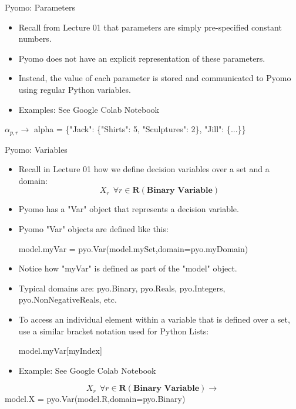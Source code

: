 \documentclass[10pt, aspectratio=169]{beamer}
\begin{document}
\begin{frame}{Pyomo: Parameters}
    \begin{itemize}
        \item Recall from Lecture 01 that parameters are simply pre-specified constant numbers.
        \item Pyomo does not have an explicit representation of these parameters.
        \item Instead, the value of each parameter is stored and communicated to Pyomo using regular Python variables.
        \item Examples: See Google Colab Notebook
    \end{itemize}
    \begin{center}
        $\alpha_{p,r} \rightarrow $ alpha = \{"Jack": \{"Shirts": 5, "Sculptures": 2\}, "Jill": \{...\}\}
    \end{center}
\end{frame}

\begin{frame}{Pyomo: Variables}
    \begin{itemize}
        \item Recall in Lecture 01 how we define decision variables over a set and a domain:
        $$X_r \ \ \forall r \in \textbf{R} \left(\textbf{Binary\ Variable}\right)$$
        \item Pyomo has a "Var" object that represents a decision variable.
        \item Pyomo "Var" objects are defined like this:
        
        \hspace{0.25cm} model.myVar = pyo.Var(model.mySet,domain=pyo.myDomain)
        \item Notice how "myVar" is defined as part of the "model" object.
        \item Typical domains are: pyo.Binary, pyo.Reals, pyo.Integers, pyo.NonNegativeReals, etc.
        \item To access an individual element within a variable that is defined over a set, use a similar bracket notation used for Python Lists:
        
        \hspace{0.25cm} model.myVar[myIndex]

        \item Example: See Google Colab Notebook
    \end{itemize}
    \begin{center}
        $$X_r \ \ \forall r \in \textbf{R} \left(\textbf{Binary\ Variable}\right) \rightarrow $$ model.X = pyo.Var(model.R,domain=pyo.Binary)
    \end{center}
\end{frame}
\end{document}
